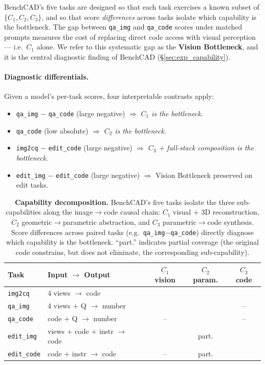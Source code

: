 \documentclass{article}
\newcommand{\cmark}{\ding{51}}
\begin{document}
BenchCAD's five tasks are designed so that each task exercises a known subset of $\{C_1, C_2, C_3\}$, and so that score \emph{differences} across tasks isolate which capability is the bottleneck. The gap between \texttt{qa\_img} and \texttt{qa\_code} scores under matched prompts measures the cost of replacing direct code access with visual perception --- i.e.\ $C_1$ alone. We refer to this systematic gap as the \textbf{Vision Bottleneck}, and it is the central diagnostic finding of BenchCAD (\S\ref{sec:exp_capability}).

\paragraph{Diagnostic differentials.} Given a model's per-task scores, four interpretable contrasts apply:
\begin{itemize}[leftmargin=1.2em,topsep=2pt,itemsep=1pt]
\item \texttt{qa\_img} $-$ \texttt{qa\_code} (large negative) $\Rightarrow$ \emph{$C_1$ is the bottleneck}.
\item \texttt{qa\_code} (low absolute) $\Rightarrow$ \emph{$C_2$ is the bottleneck}.
\item \texttt{img2cq} $-$ \texttt{edit\_code} (large negative) $\Rightarrow$ \emph{$C_3$ + full-stack composition is the bottleneck}.
\item \texttt{edit\_img} $-$ \texttt{edit\_code} (large negative) $\Rightarrow$ Vision Bottleneck preserved on edit tasks.
\end{itemize}

\begin{table}[t]
\centering
\small
\caption{\textbf{Capability decomposition.} BenchCAD's five tasks isolate the three sub-capabilities along the image$\to$code causal chain: $C_1$ visual + 3D reconstruction, $C_2$ geometric$\to$parametric abstraction, and $C_3$ parametric$\to$code synthesis. Score differences across paired tasks (e.g.\ \texttt{qa\_img}$-$\texttt{qa\_code}) directly diagnose which capability is the bottleneck. ``part.'' indicates partial coverage (the original code constrains, but does not eliminate, the corresponding sub-capability).}
\label{tab:capability}
\begin{tabular}{llccc}
\toprule
Task & Input $\to$ Output & $C_1$ vision & $C_2$ param. & $C_3$ code \\
\midrule
\texttt{img2cq}    & 4 views $\to$ code              & \cmark & \cmark & \cmark \\
\texttt{qa\_img}   & 4 views $+$ Q $\to$ number      & \cmark & \cmark & --     \\
\texttt{qa\_code}  & code $+$ Q $\to$ number         & --     & \cmark & --     \\
\texttt{edit\_img} & views $+$ code $+$ instr $\to$ code  & \cmark & part.  & \cmark \\
\texttt{edit\_code}& code $+$ instr $\to$ code       & --     & part.  & \cmark \\
\bottomrule
\end{tabular}
\end{table}
\end{document}
